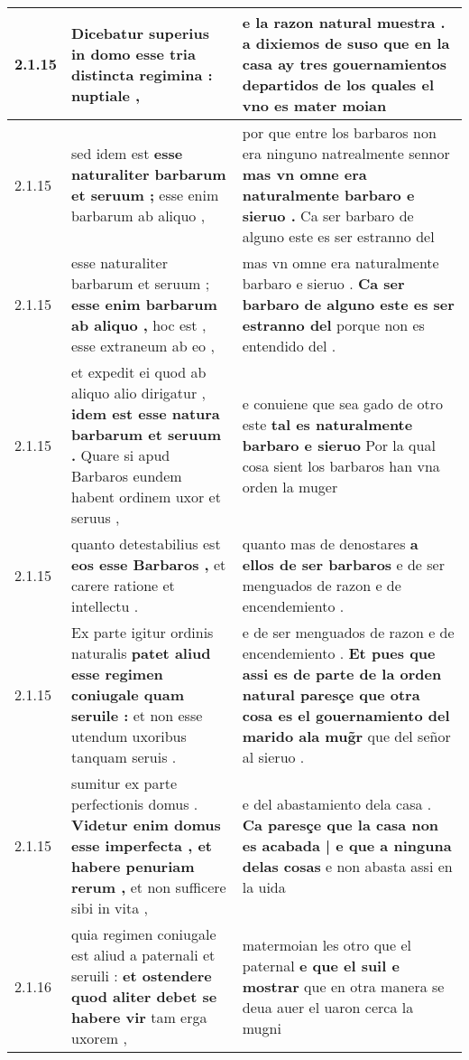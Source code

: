 \begin{tabular}{|p{1cm}|p{6.5cm}|p{6.5cm}|}
2.1.15 & Dicebatur superius \textbf{ in domo esse tria distincta regimina : } nuptiale , & e la razon natural muestra . \textbf{ a dixiemos de suso que en la casa ay tres gouernamientos departidos } de los quales el vno es mater moian \\\hline
2.1.15 & sed idem est \textbf{ esse naturaliter barbarum et seruum ; } esse enim barbarum ab aliquo , & por que entre los barbaros non era ninguno natrealmente sennor \textbf{ mas vn omne era naturalmente barbaro e sieruo . } Ca ser barbaro de alguno este es ser estranno del \\\hline
2.1.15 & esse naturaliter barbarum et seruum ; \textbf{ esse enim barbarum ab aliquo , } hoc est , esse extraneum ab eo , & mas vn omne era naturalmente barbaro e sieruo . \textbf{ Ca ser barbaro de alguno este es ser estranno del } porque non es entendido del . \\\hline
2.1.15 & et expedit ei quod ab aliquo alio dirigatur , \textbf{ idem est esse natura barbarum et seruum . } Quare si apud Barbaros eundem habent ordinem uxor et seruus , & e conuiene que sea gado de otro este \textbf{ tal es naturalmente barbaro e sieruo } Por la qual cosa sient los barbaros han vna orden la muger \\\hline
2.1.15 & quanto detestabilius est \textbf{ eos esse Barbaros , } et carere ratione et intellectu . & quanto mas de denostares \textbf{ a ellos de ser barbaros } e de ser menguados de razon e de encendemiento . \\\hline
2.1.15 & Ex parte igitur ordinis naturalis \textbf{ patet aliud esse regimen coniugale quam seruile : } et non esse utendum uxoribus tanquam seruis . & e de ser menguados de razon e de encendemiento . \textbf{ Et pues que assi es de parte de la orden natural paresçe que otra cosa es el gouernamiento del marido ala mug̃r } que del señor al sieruo . \\\hline
2.1.15 & sumitur ex parte perfectionis domus . \textbf{ Videtur enim domus esse imperfecta , et habere penuriam rerum , } et non sufficere sibi in vita , & e del abastamiento dela casa . \textbf{ Ca paresçe que la casa non es acabada | e que a ninguna delas cosas } e non abasta assi en la uida \\\hline
2.1.16 & quia regimen coniugale est aliud a paternali et seruili : \textbf{ et ostendere quod aliter debet se habere vir } tam erga uxorem , & matermoian les otro que el paternal \textbf{ e que el suil e mostrar } que en otra manera se deua auer el uaron cerca la mugni \\\hline

\end{tabular}
